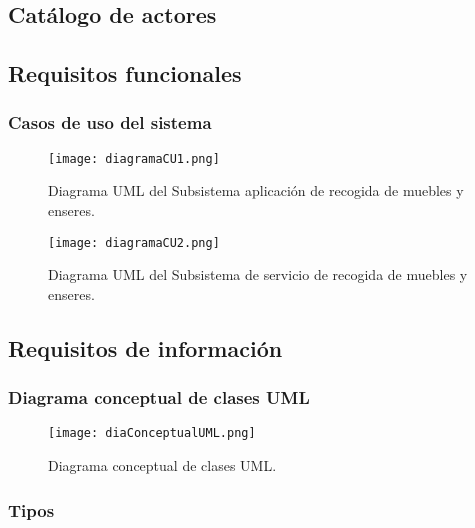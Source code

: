 \subsection{Catálogo de actores}
	
	
	
\subsection{Requisitos funcionales}
\subsubsection*{Casos de uso del sistema}
	\begin{figure}[H]
	\centering
 	   \texttt{[image: diagramaCU1.png]} 
  	  \caption{Diagrama UML del Subsistema aplicación de recogida de muebles y enseres.}
	\end{figure}	
	
	
		
	
		
	
	\begin{figure}[H]
	\centering
 	   \texttt{[image: diagramaCU2.png]} 
  	  \caption{Diagrama UML del Subsistema de servicio de recogida de muebles y enseres.}
	\end{figure}	

\subsection{Requisitos de información}
	
	
	
		
	
		
	
	
	\newpage
	\subsubsection*{Diagrama conceptual de clases UML}
	\begin{figure}[H]
	\centering
 	   \texttt{[image: diaConceptualUML.png]} 
  	  \caption{Diagrama conceptual de clases UML.}
	\end{figure}
	
	\newpage
	\subsubsection*{Tipos}
	
		
			
	
		
				
